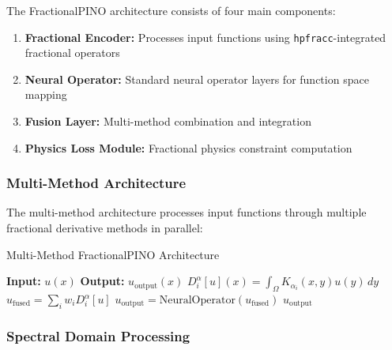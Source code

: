 \documentclass[12pt,a4paper]{article}
\theoremstyle{definition}
\begin{document}
The FractionalPINO architecture consists of four main components:

\begin{enumerate}
    \item \textbf{Fractional Encoder:} Processes input functions using \texttt{hpfracc}-integrated fractional operators
    \item \textbf{Neural Operator:} Standard neural operator layers for function space mapping
    \item \textbf{Fusion Layer:} Multi-method combination and integration
    \item \textbf{Physics Loss Module:} Fractional physics constraint computation
\end{enumerate}


\subsubsection{Multi-Method Architecture}

The multi-method architecture processes input functions through multiple fractional derivative methods in parallel:

\begin{algorithm}
\caption{Multi-Method FractionalPINO Architecture}
\begin{algorithmic}[1]
\STATE \textbf{Input:} $u(x)$
\STATE \textbf{Output:} $u_{\text{output}}(x)$
\STATE
{}
    \STATE $D^\alpha_i[u](x) = \int_\Omega K_{\alpha_i}(x,y) u(y) \, dy$
\ENDFOR
\STATE
\STATE $u_{\text{fused}} = \sum_i w_i D^\alpha_i[u]$
\STATE $u_{\text{output}} = \text{NeuralOperator}(u_{\text{fused}})$
\STATE
\RETURN $u_{\text{output}}$
\end{algorithmic}
\end{algorithm}

\subsubsection{Spectral Domain Processing}
\end{document}
